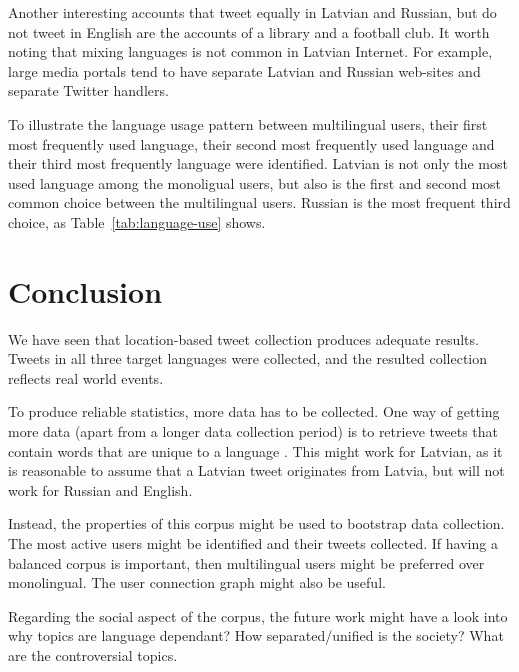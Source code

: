 \documentclass[11pt,a4paper]{article}
\begin{document}
Another interesting accounts that tweet equally in Latvian and Russian, but do not tweet in English are the accounts of a library and a football club. It worth noting that mixing languages is not common in Latvian Internet. For example, large media portals tend to have separate Latvian and Russian web-sites and separate Twitter handlers.

To illustrate the language usage pattern between multilingual users, their first most frequently used language, their second most frequently used language and their third most frequently language were identified. Latvian is not only the most used language among the monoligual users, but also is the first and second most common choice between the multilingual users. Russian is the most frequent third choice, as Table~\ref{tab:language-use} shows.



\section{Conclusion}

We have seen that location-based tweet collection produces adequate results. Tweets in all three target languages were collected, and the resulted collection reflects real world events.

To produce reliable statistics, more data has to be collected. One way of getting more data (apart from a longer data collection period) is to retrieve tweets that contain words that are unique to a language \cite{sang2013}. This might work for Latvian, as it is reasonable to assume that a Latvian tweet originates from Latvia, but will not work for Russian and English.

Instead, the properties of this corpus might be used to bootstrap data collection. The most active users might be identified and their tweets collected. If having a balanced corpus is important, then multilingual users might be preferred over monolingual. The user connection graph might also be useful.

Regarding the social aspect of the corpus, the future work might have a look into why topics are language dependant? How separated/unified is the society? What are the controversial topics.



\end{document}
